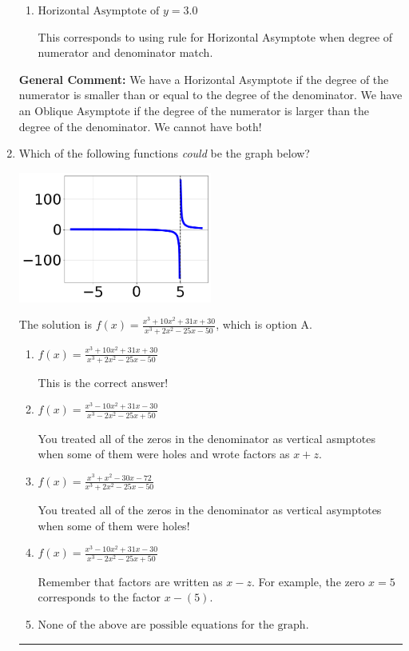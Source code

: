 \documentclass{extbook}[14pt]
\newcommand{\litem}[1]{\item #1

\rule{\textwidth}{0.4pt}}
\begin{document}
\begin{enumerate}
{\begin{enumerate}[label=\Alph*.]
This is the correct answer.
\item \( \text{Horizontal Asymptote of } y = 3.0  \)

This corresponds to using rule for Horizontal Asymptote when degree of numerator and denominator match.
\end{enumerate}

\textbf{General Comment:} We have a Horizontal Asymptote if the degree of the numerator is smaller than or equal to the degree of the denominator. We have an Oblique Asymptote if the degree of the numerator is larger than the degree of the denominator. We cannot have both!
}
\litem{
Which of the following functions \textit{could} be the graph below?

\begin{center}
    \includegraphics[width=0.5\textwidth]{../Figures/identifyGraphOfRationalFunctionCopyC.png}
\end{center}


The solution is \( f(x)=\frac{x^{3} +10 x^{2} +31 x + 30}{x^{3} +2 x^{2} -25 x -50} \), which is option A.\begin{enumerate}[label=\Alph*.]
\item \( f(x)=\frac{x^{3} +10 x^{2} +31 x + 30}{x^{3} +2 x^{2} -25 x -50} \)

This is the correct answer!
\item \( f(x)=\frac{x^{3} -10 x^{2} +31 x -30}{x^{3} -2 x^{2} -25 x + 50} \)

You treated all of the zeros in the denominator as vertical asmptotes when some of them were holes and wrote factors as $x+z$.
\item \( f(x)=\frac{x^{3} + x^{2} -30 x -72}{x^{3} +2 x^{2} -25 x -50} \)

You treated all of the zeros in the denominator as vertical asymptotes when some of them were holes!
\item \( f(x)=\frac{x^{3} -10 x^{2} +31 x -30}{x^{3} -2 x^{2} -25 x + 50} \)

Remember that factors are written as $x-z$. For example, the zero $x=5$ corresponds to the factor $x-(5)$.
\item \( \text{None of the above are possible equations for the graph.} \)


\end{enumerate}}
\end{enumerate}
\end{document}
